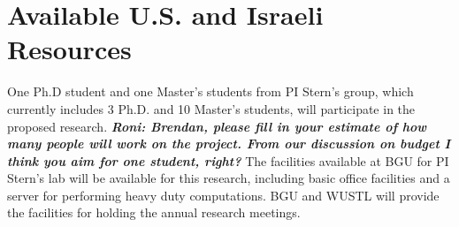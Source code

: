\documentclass[12pt]{article}
\newcommand{\note}[1]{\textbf{\textit{#1}}}
\begin{document}
\section{Available U.S. and Israeli Resources}
One Ph.D student and one Master’s students from PI Stern’s group, which currently includes 3 Ph.D. and 10 Master's students, will participate in the proposed research. 
\note{Roni: Brendan, please fill in your estimate of how many people will work on the project. From our discussion on budget I think you aim for one student, right?}
The facilities available at BGU for PI Stern’s
lab will be available for this research, including basic office facilities and a server for performing heavy duty computations. BGU and WUSTL will provide the facilities for holding the annual research meetings.




\pagebreak


\end{document}

